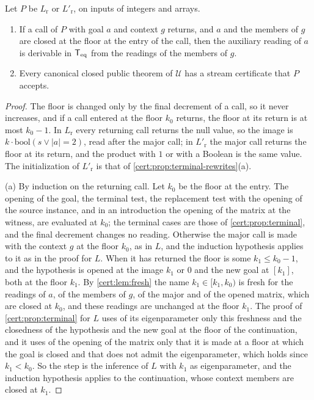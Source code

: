 \begin{proposition}\label{cert:prop:return-reservation}
Let $P$ be $L_{\mathrm r}$ or $L'_{\mathrm r}$, on inputs of integers and arrays.
\begin{enumerate}[label=(\alph*)]
\item If a call of $P$ with goal $a$ and context $g$ returns, and $a$ and the
members of $g$ are closed at the floor at the entry of the call, then the
auxiliary reading of $a$ is derivable in $\mathsf{T}_{\mathrm{eq}}$ from the readings of the members
of $g$.
\item Every canonical closed public theorem of $\mathcal U$ has a stream
certificate that $P$ accepts.
\end{enumerate}
\end{proposition}
\begin{proof}
The floor is changed only by the final decrement of a call, so it never
increases, and if a call entered at the floor $k_0$ returns, the floor at its
return is at most $k_0-1$. In $L_{\mathrm r}$ every returning call returns the
null value, so the image is $k\cdot\mathrm{bool}(s\lor\lvert a\rvert=2)$, read
after the major call; in $L'_{\mathrm r}$ the major call returns the floor at its
return, and the product with $1$ or with a Boolean is the same value. The
initialization of $L'_{\mathrm r}$ is that of \cref{cert:prop:terminal-rewrites}(a).

(a) By induction on the returning call. Let $k_0$ be the floor at the entry. The
opening of the goal, the terminal test, the replacement test with the opening of
the source instance, and in an introduction the opening of the matrix at the
witness, are evaluated at $k_0$; the terminal cases are those of
\cref{cert:prop:terminal}, and the final decrement changes no reading. Otherwise
the major call is made with the context $g$ at the floor $k_0$, as in $L$, and
the induction hypothesis applies to it as in the proof for $L$. When it has
returned the floor is some $k_1\le k_0-1$, and the hypothesis is
opened at the image $k_1$ or $0$ and the new goal at $[k_1]$, both at the floor
$k_1$. By \cref{cert:lem:fresh} the name $k_1\in[k_1,k_0)$ is fresh for the
readings of $a$, of the members of $g$, of the major and of the opened matrix,
which are closed at $k_0$, and these readings are unchanged at the floor $k_1$.
The proof of \cref{cert:prop:terminal} for $L$ uses of its eigenparameter only
this freshness and the closedness of the hypothesis and the new goal at the floor
of the continuation, and it uses of the opening of the matrix only that it is
made at a floor at which the goal is closed and that does not admit the
eigenparameter, which holds since $k_1<k_0$. So the step is the inference of
$L$ with $k_1$ as eigenparameter, and the induction hypothesis applies to the
continuation, whose context members are closed at $k_1$.


\end{proof}
